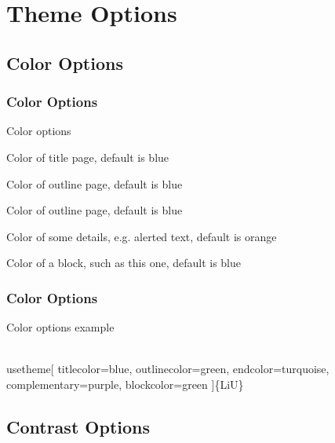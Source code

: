 \documentclass[noamsthm, english]{beamer}%
\newenvironment{codeblock}[1][Example Code]
    {\begin{block}{#1}\footnotesize\vspace{-1em}\begin{semiverbatim}}%
    {\end{semiverbatim}\vspace{-1em}\end{block}}%
\begin{document}
\makeend

\section{Theme Options}
\subsection{Color Options}

\begin{frame}
\frametitle{Color Options}
\begin{block}{Color options}
\centering \footnotesize
\begin{description}[complementary]
\item[titlecolor] Color of title page, default is blue
\item[outlinecolor] Color of outline page, default is blue
\item[endcolor] Color of outline page, default is blue
\item[complementary] Color of some details, e.g. alerted text, default is orange
\item[blockcolor] Color of a block, such as this one, default is blue
\end{description}
\end{block}
\end{frame}

\begin{frame}[fragile]
\frametitle{Color Options}
\begin{codeblock}[Color options example]
\\usetheme[%
\hspace{1em}titlecolor=blue,%
\hspace{1em}outlinecolor=green,%
\hspace{1em}endcolor=turquoise,%
\hspace{1em}complementary=purple,%
\hspace{1em}blockcolor=green%
]\{LiU\}
\end{codeblock}
\end{frame}

\subsection{Contrast Options}
\end{document}
